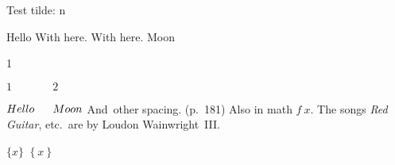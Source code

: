 \documentclass{minimal}
\begin{document}
Test tilde: \tilde n

Hello
\thinspace
\medspace
\thickspace
\bigskip
\hspace{1em}
\hfill
\vspace{1em}
\vfill
With  here.
With  here.
Moon

1 \, \: \; \! \quad {}

$1 \, \: \; \! \quad \qquad 2$

$Hello
\thinspace
\medspace
\thickspace
\bigskip
\hspace{1em}
\hfill
\vspace{1em}
Moon$
And~other spacing. (p.~181) \citet[Sect.~3]{MyRef:2023}
Also in math $f~x$.
The songs \textit{Red Guitar}, etc.\ are by Loudon Wainwright~III\@.

$\{x\}$
$\left\{x\right\}$
\end{document}
